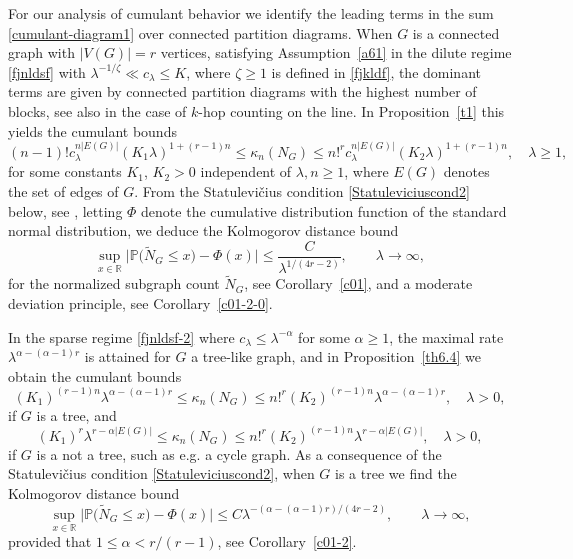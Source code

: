 \documentclass[bj,authoryear,noshowframe]{imsart}
\theoremstyle{plain}
\theoremstyle{remark}
\def\P{\mathbb{P}}
\def\real{{\mathord{\mathbb R}}}
\begin{document}
 For our analysis of cumulant behavior
 we identify the leading terms in the sum \eqref{cumulant-diagram1}
 over connected partition diagrams. 
 When $G$ is a connected graph with $|V(G)|=r$ vertices,
 satisfying
 Assumption~\ref{a61} in the dilute regime \eqref{fjnldsf}
 with $\lambda^{-1/\zeta } \ll c_\lambda \leq K$,
 where $\zeta \geq 1$ is defined in \eqref{fjkldf}, 
 the dominant terms are given by connected partition diagrams with the
 highest number of blocks, 
 see also \cite{privaultkhops}
 in the case of $k$-hop counting on the line.
 In Proposition~\ref{t1} this yields the cumulant bounds 
$$
 (n-1)! c_\lambda^{n |E(G)| } ( K_1 \lambda )^{1+(r-1)n} 
 \leq 
  \kappa_n(N_G)
\leq 
n!^r c_\lambda^{n |E(G) |} ( K_2 \lambda )^{1+(r-1)n},
\quad \lambda \geq 1, 
$$
for some constants $K_1$, $K_2>0$ independent of $\lambda, n\geq 1$,
where $E(G)$ denotes the set of edges of $G$.
 From the {Statulevi\v{c}ius condition}
 \eqref{Statuleviciuscond2} below, see \cite{rudzkis,doering},
 letting $\Phi$ denote the cumulative distribution function of the standard normal distribution, 
 we deduce the Kolmogorov distance bound 
$$
\sup_{x\in \real}
\big| \P \big( \widetilde{N}_G \leq x \big) - \Phi (x) \big| \leq
\frac{C }{\lambda^{1/(4r - 2)}},
\qquad \lambda \to \infty, 
$$ 
 for the normalized subgraph count $\widetilde{N}_G$, 
see Corollary~\ref{c01}, and a moderate deviation principle, 
 see Corollary~\ref{c01-2-0}. 
  
 In the sparse regime \eqref{fjnldsf-2} where
 $ c_\lambda \leq \lambda^{-\alpha}$ for some $\alpha \geq 1$,
 the maximal rate $\lambda^{
 \alpha         -(\alpha - 1)r 
          }$
 is attained for $G$ a tree-like graph, and
 in Proposition~\ref{th6.4} we obtain the cumulant bounds %
$$ 
    \nonumber %
            (K_1)^{(r-1)n}
    \lambda^{
 \alpha     -(\alpha - 1)r 
      }
     \leq 
  \kappa_n(N_G)
  \leq
  n!^r
  (K_2)^{(r-1)n}
  \lambda^{
   \alpha -(\alpha - 1)r 
    } 
  , \quad \lambda > 0, 
$$ 
  if $G$ is a tree, and
$$ 
  \nonumber %
    (K_1)^r 
  \lambda^{r-\alpha |E(G)|}
  \leq 
  \kappa_n(N_G)
  \leq
    n!^r
    (K_2)^{(r-1)n}
    \lambda^{r-\alpha |E(G)|}, \quad \lambda >0, 
$$ 
  if $G$ is a not a tree, such as e.g. a cycle graph.
  As a consequence of the {Statulevi\v{c}ius condition}
  \eqref{Statuleviciuscond2}, 
 when $G$ is a tree
 we find the Kolmogorov distance bound %
$$  
\sup_{x\in \real}
\big| \P \big( \widetilde{N}_G \leq x \big) - \Phi (x) \big| \leq
 C \lambda^{
    - (
\alpha    -(\alpha - 1)r 
        ) / ( 4r - 2) }
, \qquad \lambda \to \infty, 
$$ 
 provided that $1 \leq \alpha < r/(r-1)$, 
 see Corollary~\ref{c01-2}. 
 
\end{document}
